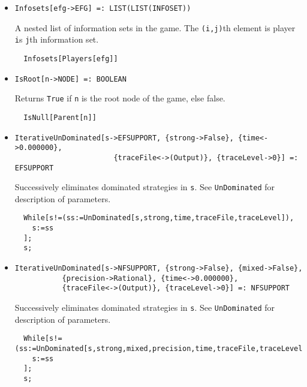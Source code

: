 \begin{itemize}
\item{}
\protect \large \begin{verbatim}
Infosets[efg->EFG] =: LIST(LIST(INFOSET)) 
\end{verbatim}\normalsize

\bd 
A nested list of information sets in the game. The \verb+(i,j)+th
element is player \verb+i+s \verb+j+th information set.  
\begin{verbatim}
  Infosets[Players[efg]]
\end{verbatim} 
\ed

\item{}
\protect \large \begin{verbatim}
IsRoot[n->NODE] =: BOOLEAN 
\end{verbatim}\normalsize

\bd 
Returns \verb+True+ if \verb+n+ is the root node of the game, else
false.  
\begin{verbatim}
  IsNull[Parent[n]]
\end{verbatim} 
\ed

\item{}
\protect \large \begin{verbatim}
IterativeUnDominated[s->EFSUPPORT, {strong->False}, {time<->0.000000}, 
                       {traceFile<->(Output)}, {traceLevel->0}] =: EFSUPPORT 
\end{verbatim}\normalsize

\bd 
Successively eliminates dominated strategies in \verb+s+. See
\verb+UnDominated+ for description of parameters.  
\begin{verbatim}
  While[s!=(ss:=UnDominated[s,strong,time,traceFile,traceLevel]),
    s:=ss
  ];
  s;
\end{verbatim} 
\ed

\item{}
\protect \large \begin{verbatim}
IterativeUnDominated[s->NFSUPPORT, {strong->False}, {mixed->False}, 
           {precision->Rational}, {time<->0.000000}, 
           {traceFile<->(Output)}, {traceLevel->0}] =: NFSUPPORT 
\end{verbatim}\normalsize

\bd 
Successively eliminates dominated strategies in \verb+s+. See
\verb+UnDominated+ for description of parameters.  
\begin{verbatim}
  While[s!=(ss:=UnDominated[s,strong,mixed,precision,time,traceFile,traceLevel]),
    s:=ss
  ];
  s;
\end{verbatim} 
\ed


\end{itemize}
